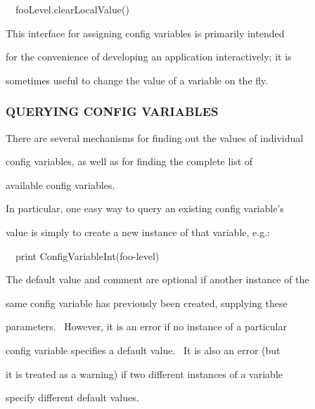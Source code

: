 \documentclass[a4paper]{article}
\begin{document}
\bigskip

{\color{black}
\ \ fooLevel.clearLocalValue()}


\bigskip

{\color{black}
This interface for assigning config variables is primarily intended}

{\color{black}
for the convenience of developing an application interactively; it is}

{\color{black}
sometimes useful to change the value of a variable on the fly.}


\bigskip


\bigskip

\subsubsection[QUERYING CONFIG VARIABLES]{QUERYING CONFIG VARIABLES}
\hypertarget{RefHeading312361927442421}{}
\bigskip

{\color{black}
There are several mechanisms for finding out the values of individual}

{\color{black}
config variables, as well as for finding the complete list of}

{\color{black}
available config variables.}


\bigskip

{\color{black}
In particular, one easy way to query an existing config variable's}

{\color{black}
value is simply to create a new instance of that variable, e.g.:}


\bigskip

{\color{black}
\ \ print ConfigVariableInt({\textquotedbl}foo-level{\textquotedbl})}


\bigskip

{\color{black}
The default value and comment are optional if another instance of the}

{\color{black}
same config variable has previously been created, supplying these}

{\color{black}
parameters. \ However, it is an error if no instance of a particular}

{\color{black}
config variable specifies a default value. \ It is also an error (but}

\clearpage
\bigskip

{\color{black}
it is treated as a warning) if two different instances of a variable}

{\color{black}
specify different default values.}
\end{document}
